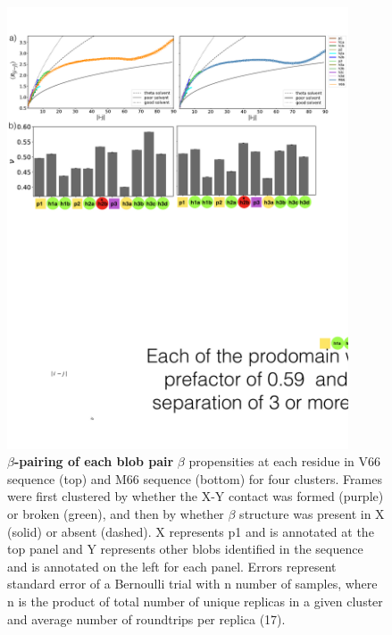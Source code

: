 \documentclass[10pt,letterpaper]{article}
\begin{document}
\begin{figure}[!ht]
\includegraphics[scale=0.5,width=0.9\textwidth,trim={0 0cm 0 0cm},clip]{./figures/S5.pdf}
\caption{{\bf $\beta$-pairing of each blob pair} $\beta$ propensities at each residue in V66 sequence (top) and M66 sequence (bottom) for four clusters. Frames were first clustered by whether the X-Y contact was formed (purple) or broken (green), and then by whether $\beta$ structure was present in X (solid) or absent (dashed). X represents p1 and is annotated at the top panel and Y represents other blobs identified in the sequence and is annotated on the left for each panel. Errors represent standard error of a Bernoulli trial with n number of samples, where n is the product of total number of unique replicas in a given cluster and average number of roundtrips per replica (17).} 
\label{S9} 
\end{figure}
\end{document}

